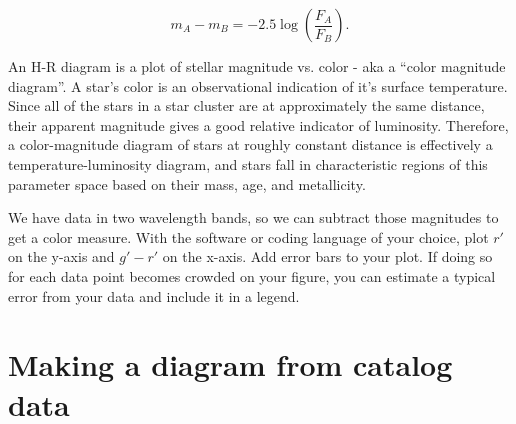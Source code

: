 \begin{equation}
	m_A - m_B = -2.5\log\left(\frac{F_A}{F_B}\right).
\end{equation}

An H-R diagram is a plot of stellar magnitude vs. color - aka a ``color magnitude diagram''. A star's color is an observational indication of it's surface temperature. Since all of the stars in a star cluster are at approximately the same distance, their apparent magnitude gives a good relative indicator of luminosity. Therefore, a color-magnitude diagram of stars at roughly constant distance is effectively a temperature-luminosity diagram, and stars fall in characteristic regions of this parameter space based on their mass, age, and metallicity.

We have data in two wavelength bands, so we can subtract those magnitudes to get a color measure. With the software or coding language of your choice, plot $r'$ on the y-axis and $g' - r'$ on the x-axis. Add error bars to your plot. If doing so for each data point becomes crowded on your figure, you can estimate a typical error from your data and include it in a legend. 


\section{Making a diagram from catalog data}

